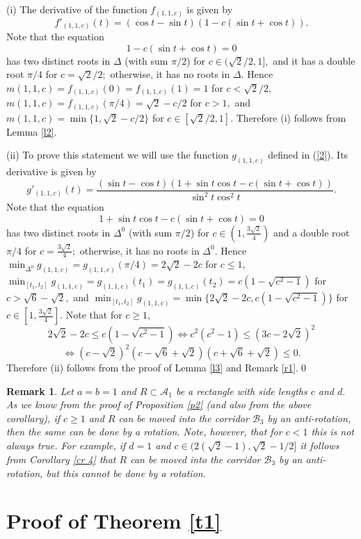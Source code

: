 \documentclass[12pt]{amsart}
\newtheorem{rem}[thm]{Remark}
\def\A{\mathcal A}
\def\B{\mathcal B}
\def\DD{\Delta}
\def\s{\smallskip}
\def\n{\noindent}
\def\ss{\subset}
\begin{document}
\n{\it Proof.} (i) The derivative of the function $f_{(1,1,c)}$ is given by
$$f'_{(1,1,c)}(t)=(\cos t-\sin t)(1-c(\sin t+\cos t)).$$
Note that the equation
$$1-c(\sin t+\cos t)=0$$
has two distinct roots in $\DD$ (with sum $\pi/2$) for
$c\in(\sqrt2/2,1],$ and it has a double root $\pi/4$ for
$c=\sqrt2/2;$ otherwise, it has no roots in $\DD.$ Hence
$m(1,1,c)=f_{(1,1,c)}(0)=f_{(1,1,c)}(1)=1$ for $c<\sqrt2/2,$
$m(1,1,c)=f_{(1,1,c)}(\pi/4)=\sqrt{2}-c/2$ for $c>1,$ and
$m(1,1,c)=\min\{1,\sqrt{2}-c/2\}$ for $c\in[\sqrt2/2,1].$
Therefore (i) follows from Lemma \ref{l2}.

\s

(ii) To prove this statement we will use the function
$g_{(1,1,c)}$ defined in (\ref{2}). Its derivative is given by
$$g'_{(1,1,c)}(t)= \frac{(\sin t-\cos t)(1+\sin t\cos t-c(\sin t+\cos
t))}{\sin^2t\cos^2t}.$$ Note that the equation
$$1+\sin t\cos t-c(\sin t+\cos t)=0$$ has two distinct roots in $\DD^0$
(with sum $\pi/2$) for $c\in(1,\frac{3\sqrt{2}}{4})$ and a double
root $\pi/4$ for $c=\frac{3\sqrt{2}}{4};$ otherwise, it has no
roots in $\DD^0.$ Hence
$\min_{\Delta^0}g_{(1,1,c)}=g_{(1,1,c)}(\pi/4)=2\sqrt2-2c$ for
$c\le 1,$
$\min_{[t_1,t_2]}g_{(1,1,c)}=g_{(1,1,c)}(t_1)=g_{(1,1,c)}(t_2)=
c(1-\sqrt{c^2-1})$ for $c>\sqrt6-\sqrt 2,$ and
$\min_{[t_1,t_2]}g_{(1,1,c)}=\min\{2\sqrt2-2c,c(1-\sqrt{c^2-1})\}$
for $c\in[1,\frac{3\sqrt{2}}{4}].$ Note that for $c\ge 1,$
$$2\sqrt2-2c\le c(1-\sqrt{c^2-1})\Leftrightarrow c^2(c^2-1)\le(3c-2\sqrt2)^2$$
$$\Leftrightarrow(c-\sqrt2)^2(c-\sqrt6+\sqrt2)(c+\sqrt6+\sqrt2)\le 0.$$
Therefore (ii) follows from the proof of Lemma \ref{l3} and Remark
\ref{r1}.\qed

\begin{rem}\label{r2} Let $a=b=1$ and $R\ss\A_1$ be a rectangle with side
lengths $c$ and  $d.$ As we know from the proof of Proposition
\ref{p2} (and also from the above corollary), if $c\geq 1$ and $R$
can be moved into the corridor $\B_3$ by an anti-rotation, then
the same can be done by a rotation. Note, however, that for $c<1$
this is not always true. For example, if $d=1$ and $c\in
(2(\sqrt{2}-1), \sqrt{2}-1/2]$ it follows from Corollary \ref{cr
4} that $R$ can be moved into the corridor $\B_3$ by an
anti-rotation, but this cannot be done by a rotation.
\end{rem}


\section{Proof of Theorem \ref{t1}}
\end{document}
